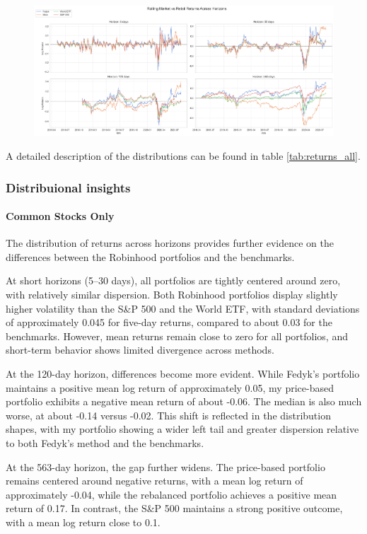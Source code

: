 \begin{figure}[h!]
    \centering
    \includegraphics[width=1\linewidth]
    {../images/returns/comparison_2.png}
\end{figure}

A detailed description of the distributions can be found in table \ref{tab:returns_all}.

\subsubsection{Distribuional insights}
\paragraph{Common Stocks Only}

The distribution of returns across horizons provides further evidence on the differences between the Robinhood portfolios and the benchmarks.

At short horizons (5–30 days), all portfolios are tightly centered around zero, with relatively similar dispersion. 
Both Robinhood portfolios display slightly higher volatility than the S\&P 500 and the World ETF, with standard deviations of approximately 0.045 for five-day returns, compared to about 0.03 for the benchmarks. 
However, mean returns remain close to zero for all portfolios, and short-term behavior shows limited divergence across methods.

At the 120-day horizon, differences become more evident. 
While Fedyk's portfolio maintains a positive mean log return of approximately 0.05, my price-based portfolio exhibits a negative mean return of about -0.06. 
The median is also much worse, at about -0.14 versus -0.02.
This shift is reflected in the distribution shapes, with my portfolio showing a wider left tail and greater dispersion relative to both Fedyk’s method and the benchmarks.

At the 563-day horizon, the gap further widens. 
The price-based portfolio remains centered around negative returns, with a mean log return of approximately -0.04, while the rebalanced portfolio achieves a positive mean return of 0.17. 
In contrast, the S\&P 500 maintains a strong positive outcome, with a mean log return close to 0.1. 

